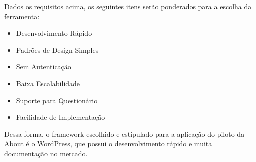Dados os requisitos acima, os seguintes itens serão ponderados para a escolha da ferramenta:
\begin{itemize}
    \item Desenvolvimento Rápido
    \item Padrões de Design Simples
    \item Sem Autenticação
    \item Baixa Escalabilidade
    \item Suporte para Questionário
    \item Facilidade de Implementação
\end{itemize}

Dessa forma, o framework escolhido e estipulado para a aplicação do
piloto da About é o WordPress, que possui o desenvolvimento rápido e
muita documentação no mercado.

